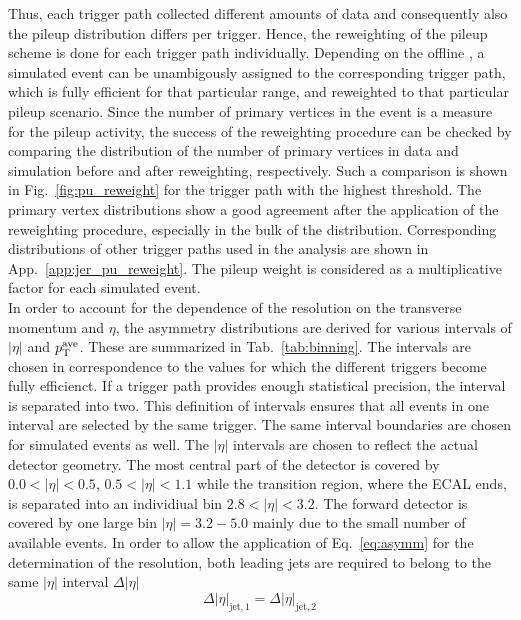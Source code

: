 Thus, each trigger path collected different amounts of data and consequently also the pileup distribution differs per trigger. Hence, the reweighting of the pileup scheme is done for each trigger path individually. Depending on the offline \ptave, a simulated event can be unambigously assigned to the corresponding trigger path, which is fully efficient for that particular \pt range, and reweighted to that particular pileup scenario. Since the number of primary vertices in the event is a measure for the pileup activity, the success of the reweighting procedure can be checked by comparing the distribution of the number of primary vertices in data and simulation before and after reweighting, respectively. Such a comparison is shown in Fig.~\ref{fig:pu_reweight} for the trigger path with the highest \ptave threshold. The primary vertex distributions show a good agreement after the application of the reweighting procedure, especially in the bulk of the distribution. Corresponding distributions of other trigger paths used in the analysis are shown in App.~\ref{app:jer_pu_reweight}. The pileup weight is considered as a multiplicative factor for each simulated event. \\
In order to account for the dependence of the resolution on the transverse momentum and $\eta$, the asymmetry distributions are derived for various intervals of $|\eta|$ and $p_{\text{T}}^\mathrm{ave}$. These are summarized in Tab.~\ref{tab:binning}. The \ptave intervals are chosen in correspondence to the \ptave values for which the different triggers become fully efficienct. If a trigger path provides enough statistical precision, the interval is separated into two. This definition of \ptave intervals ensures that all events in one \ptave interval are selected by the same trigger. The same interval boundaries are chosen for simulated events as well. The $|\eta|$ intervals are chosen to reflect the actual detector geometry. The most central part of the detector is covered by $ 0.0 < |\eta| < 0.5$, $0.5 < |\eta| < 1.1$ while the transition region, where the ECAL ends, is separated into an individiual bin $ 2.8 < |\eta| < 3.2$. The forward detector is covered by one large bin $|\eta| = 3.2 - 5.0$ mainly due to the small number of available events. In order to allow the application of Eq.~\ref{eq:asymm} for the determination of the resolution, both leading jets are required to belong to the same $|\eta|$ interval $\Delta |\eta|$
\begin{equation}
 \Delta |\eta|_{\mathrm{jet},1} = \Delta |\eta|_{\mathrm{jet},2}
\end{equation}
